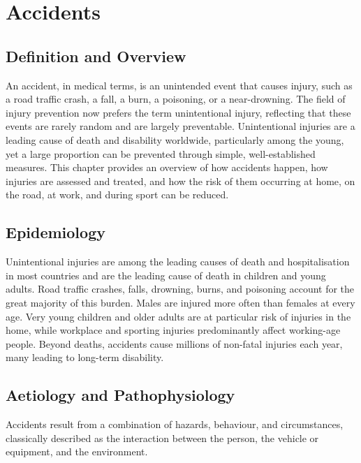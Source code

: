 \chapter{Accidents}

\section*{Definition and Overview}
An accident, in medical terms, is an unintended event that causes injury, such as a road traffic crash, a fall, a burn, a poisoning, or a near-drowning. The field of injury prevention now prefers the term unintentional injury, reflecting that these events are rarely random and are largely preventable. Unintentional injuries are a leading cause of death and disability worldwide, particularly among the young, yet a large proportion can be prevented through simple, well-established measures. This chapter provides an overview of how accidents happen, how injuries are assessed and treated, and how the risk of them occurring at home, on the road, at work, and during sport can be reduced.

\section*{Epidemiology}
Unintentional injuries are among the leading causes of death and hospitalisation in most countries and are the leading cause of death in children and young adults. Road traffic crashes, falls, drowning, burns, and poisoning account for the great majority of this burden. Males are injured more often than females at every age. Very young children and older adults are at particular risk of injuries in the home, while workplace and sporting injuries predominantly affect working-age people. Beyond deaths, accidents cause millions of non-fatal injuries each year, many leading to long-term disability.

\section*{Aetiology and Pathophysiology}
Accidents result from a combination of hazards, behaviour, and circumstances, classically described as the interaction between the person, the vehicle or equipment, and the environment.

